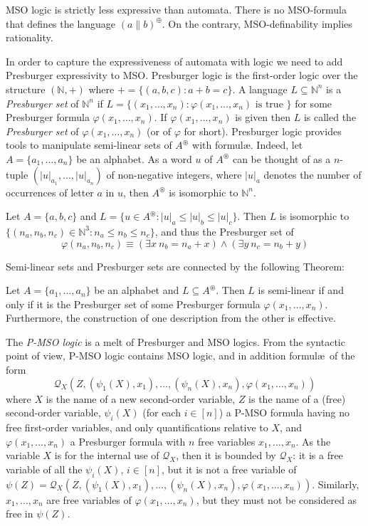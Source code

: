 \documentclass{CSML}
\begin{document}
MSO logic is strictly less expressive than automata. There is no MSO-formula that defines the language $(a\parallel b)^\oplus$. On the contrary, 
MSO-definability implies rationality.

In order to capture the expressiveness of automata with logic we need to add Presburger expressivity to MSO.
Presburger logic is the first-order logic over the structure $(\mathbb{N},+)$ where $+=\{(a,b,c) : a+b=c\}$.
A language $L\subseteq \mathbb{N}^n$ is a \emph{Presburger set} of $\mathbb{N}^n$ if $L=\{(x_1,\dots,x_n) : \varphi(x_1,\dots,x_n) \text{ is true }\}$ for some Presburger formula  $\varphi(x_1,\dots,x_n)$. If $\varphi(x_1,\dots,x_n)$ is given then $L$ is called the \emph{Presburger set} of $\varphi(x_1,\dots,x_n)$ (or of $\varphi$ for short).
Presburger logic provides tools to manipulate semi-linear sets of $A^\circledast$ with formul{\ae}.
Indeed, let $A=\{a_1,\dots,a_n\}$ be an alphabet.
As a word $u$ of $A^\circledast$ can be thought of as a $n$-tuple $(\vert u\vert_{a_1},\dots,\vert u\vert_{a_n})$ of non-negative integers, where $\vert u\vert_a$ denotes the number of occurrences of letter $a$ in $u$, then $A^\circledast$ is isomorphic to $\mathbb{N}^n$.

\begin{exa}
  \label{ex:pres1}
  Let $A=\{a,b,c\}$ and $L=\{ u\in A^\circledast : \vert u\vert_a\leq \vert u\vert_b\leq \vert u\vert_c \}$.
  Then $L$ is isomorphic to $\{ (n_a,n_b,n_c)\in\mathbb{N}^3 : n_a\leq n_b\leq n_c \}$, and thus the Presburger set of $$\varphi(n_a,n_b,n_c)\equiv(\exists x\ n_b=n_a+x)\land (\exists y\ n_c=n_b+y)$$
\end{exa}

Semi-linear sets and Presburger sets are connected by the following Theorem:
\begin{thm} \label{th:PresburgerSemilinear}
  Let $A=\{a_1,\dots,a_n\}$ be an alphabet and $L\subseteq A^\circledast$.
  Then $L$ is semi-linear if and only if it is the Presburger set of some Presburger formula $\varphi(x_1,\dots,x_n)$. 
  Furthermore, the construction of one description from the other is effective.
\end{thm}

The \emph{P-MSO logic} is a melt of Presburger and MSO logics.
From the syntactic point of view, P-MSO logic contains MSO logic, and in addition formul{\ae}\ of the form 
$$\mathcal{Q}_X(Z,(\psi_1(X),x_1),\dots,(\psi_n(X),x_n),\varphi(x_1,\dots,x_n))$$ 
where $X$ is the name of a new second-order variable, $Z$ is the name of a (free) second-order variable, $\psi_i(X)$ (for each $i\in[n]$) a P-MSO formula having 
no free first-order variables, and only quantifications relative to $X$, and $\varphi(x_1,\dots,x_n)$ a Presburger formula with $n$ free variables $x_1,\dots,x_n$. 
As the variable $X$ is for the internal use of $\mathcal{Q}_X$, then it is bounded by $\mathcal{Q}_X$: it is a free variable of all the $\psi_i(X)$, $i\in[n]$, but it is not a free variable of $\psi(Z)=\mathcal{Q}_X(Z,(\psi_1(X),x_1),\dots,(\psi_n(X),x_n),\varphi(x_1,\dots,x_n))$. Similarly, $x_1,\dots,x_n$ are free variables of $\varphi(x_1,\dots,x_n)$, but they must not be considered as free in $\psi(Z)$. 
\end{document}
